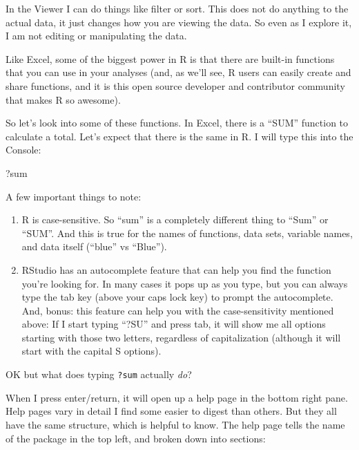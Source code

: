 \documentclass[]{book}
\newenvironment{Shaded}{\begin{snugshade}}{\end{snugshade}}
\newcommand{\NormalTok}[1]{#1}
\begin{document}
In the Viewer I can do things like filter or sort. This does not do anything to the actual data, it just changes how you are viewing the data. So even as I explore it, I am not editing or manipulating the data.

Like Excel, some of the biggest power in R is that there are built-in functions that you can use in your analyses (and, as we'll see, R users can easily create and share functions, and it is this open source developer and contributor community that makes R so awesome).

So let's look into some of these functions. In Excel, there is a ``SUM'' function to calculate a total. Let's expect that there is the same in R. I will type this into the Console:

\begin{Shaded}
\begin{Highlighting}[]
\NormalTok{?sum}
\end{Highlighting}
\end{Shaded}

A few important things to note:

\begin{enumerate}
\def\labelenumi{\arabic{enumi}.}
\item
  R is case-sensitive. So ``sum'' is a completely different thing to ``Sum'' or ``SUM''. And this is true for the names of functions, data sets, variable names, and data itself (``blue'' vs ``Blue'').
\item
  RStudio has an autocomplete feature that can help you find the function you're looking for. In many cases it pops up as you type, but you can always type the tab key (above your caps lock key) to prompt the autocomplete. And, bonus: this feature can help you with the case-sensitivity mentioned above: If I start typing ``?SU'' and press tab, it will show me all options starting with those two letters, regardless of capitalization (although it will start with the capital S options).
\end{enumerate}

OK but what does typing \texttt{?sum} actually \emph{do}?

When I press enter/return, it will open up a help page in the bottom right pane. Help pages vary in detail I find some easier to digest than others. But they all have the same structure, which is helpful to know. The help page tells the name of the package in the top left, and broken down into sections:
\end{document}

